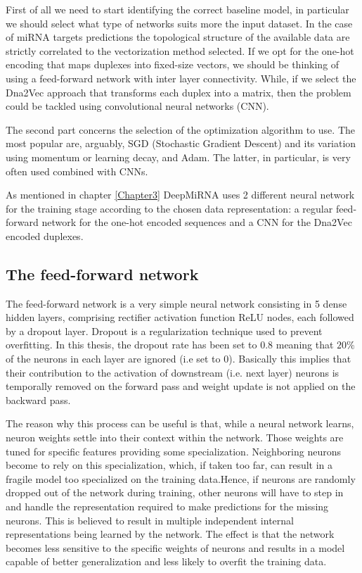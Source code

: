 First of all we need to start identifying the correct baseline model, in particular we should select what type of networks suits more the input dataset. In the case of miRNA targets predictions the topological structure of the available data are strictly correlated to the vectorization method selected. If we opt for the one-hot encoding that maps duplexes into fixed-size vectors, we should be thinking of using a feed-forward network with inter layer connectivity. While, if we select the Dna2Vec approach that transforms each duplex into a matrix, then the problem could be tackled using convolutional neural networks (CNN)\cite{dl}.  

The second part concerns the selection of the optimization algorithm to use. The most popular are, arguably, SGD (Stochastic Gradient Descent) and its variation using momentum or learning decay, and Adam. The latter, in particular, is very often used combined with CNNs.

As mentioned in chapter \ref{Chapter3} DeepMiRNA uses 2 different neural network for the training stage according to the chosen data representation: a regular feed-forward network for the one-hot encoded sequences and a CNN for the Dna2Vec encoded duplexes. 

\subsection{The feed-forward network} 
The feed-forward network is a very simple neural network consisting in 5 dense hidden layers, comprising rectifier activation function ReLU nodes, each followed by a dropout layer. Dropout\cite{dropout} is a regularization technique used to prevent overfitting. In this thesis, the dropout rate has been set to $0.8$ meaning that $20\%$ of the neurons in each layer are ignored (i.e set to 0). Basically this implies that their contribution to the activation of downstream (i.e. next layer) neurons  is temporally removed on the forward pass and weight update is not applied on the backward pass.   

The reason why this process can be useful is that, while a neural network learns, neuron weights settle into their context within the network. Those weights are tuned for specific features providing some specialization. Neighboring neurons become to rely on this specialization, which, if taken too far, can result in a fragile model too specialized on the training data.Hence, if neurons are randomly dropped out of the network during training, other neurons will have to step in and handle the representation required to make predictions for the missing neurons. This is believed to result in multiple independent internal representations being learned by the network.
The effect is that the network becomes less sensitive to the specific weights of neurons and results in a model capable of better generalization and less likely to overfit the training data.    

